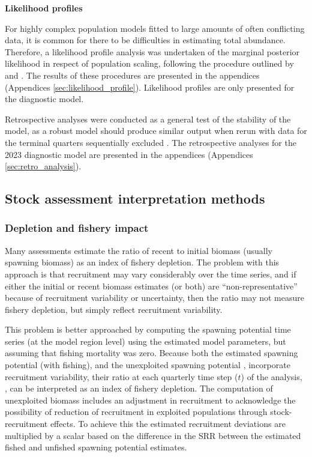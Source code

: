 \textbf{Likelihood profiles}

For highly complex population models fitted to large amounts of often conflicting data, it is common for there to be difficulties in estimating total abundance. Therefore, a likelihood profile analysis was undertaken of the marginal posterior likelihood in respect of population scaling, following the procedure outlined by \citet{mckechnie_stock_2017} and \citet{tremblay-boyer_stock_2017}. The results of these procedures are presented in the appendices (Appendices \autoref{sec:likelihood_profile}). Likelihood profiles are only presented for the diagnostic model.

Retrospective analyses were conducted as a general test of the stability of the model, as a robust model should produce similar output when rerun with data for the terminal quarters sequentially excluded \citep{cadigan_local_2005}. The retrospective analyses for the 2023 diagnostic model are presented in the appendices (Appendices \autoref{sec:retro_analysis}).

\subsection{Stock assessment interpretation methods}
\label{sec:stock_assessment_interp}

\subsubsection{Depletion and fishery impact}
\label{sec:methods_fishery_impacts}

Many assessments estimate the ratio of recent to initial biomass (usually spawning biomass) as an index of fishery depletion. The problem with this approach is that recruitment may vary considerably over the time series, and if either the initial or recent biomass estimates (or both) are \enquote{non-representative} because of recruitment variability or uncertainty, then the ratio may not measure fishery depletion, but simply reflect recruitment variability.

This problem is better approached by computing the spawning potential time series (at the model region level) using the estimated model parameters, but assuming that fishing mortality was zero. Because both the estimated spawning potential \sbt (with fishing), and the unexploited spawning potential \sbtfo, incorporate recruitment variability, their ratio at each quarterly time step ($t$) of the analysis, \sbtsbfo, can be interpreted as an index of fishery depletion. The computation of unexploited biomass includes an adjustment in recruitment to acknowledge the possibility of reduction of recruitment in exploited populations through stock-recruitment effects. To achieve this the estimated recruitment deviations are multiplied by a scalar based on the difference in the SRR between the estimated fished and unfished spawning potential estimates.

